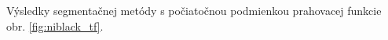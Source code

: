 \documentclass[a4paper,11pt,oneside]{article}%
\begin{document}
Výsledky segmentačnej metódy s počiatočnou podmienkou prahovacej funkcie obr. \ref{fig:niblack_tf}.

\begin{figure}[H]  
    \hspace{5px}

\end{figure}
\end{document}
